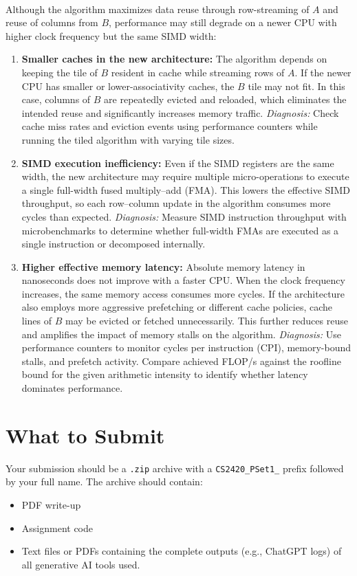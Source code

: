 \documentclass[a4 paper]{article}
\begin{document}
\\

\noindent Although the algorithm maximizes data reuse through row-streaming of $A$ and reuse of columns from $B$, performance may still degrade on a newer CPU with higher clock frequency but the same SIMD width:

\begin{enumerate}
    \item \textbf{Smaller caches in the new architecture:}  
    The algorithm depends on keeping the tile of $B$ resident in cache while streaming rows of $A$. If the newer CPU has smaller or lower-associativity caches, the $B$ tile may not fit. In this case, columns of $B$ are repeatedly evicted and reloaded, which eliminates the intended reuse and significantly increases memory traffic.  
    \textit{Diagnosis:} Check cache miss rates and eviction events using performance counters while running the tiled algorithm with varying tile sizes.

    \item \textbf{SIMD execution inefficiency:}  
    Even if the SIMD registers are the same width, the new architecture may require multiple micro-operations to execute a single full-width fused multiply–add (FMA). This lowers the effective SIMD throughput, so each row–column update in the algorithm consumes more cycles than expected.  
    \textit{Diagnosis:} Measure SIMD instruction throughput with microbenchmarks to determine whether full-width FMAs are executed as a single instruction or decomposed internally.

    \item \textbf{Higher effective memory latency:}  
    Absolute memory latency in nanoseconds does not improve with a faster CPU. When the clock frequency increases, the same memory access consumes more cycles. If the architecture also employs more aggressive prefetching or different cache policies, cache lines of $B$ may be evicted or fetched unnecessarily. This further reduces reuse and amplifies the impact of memory stalls on the algorithm.  
    \textit{Diagnosis:} Use performance counters to monitor cycles per instruction (CPI), memory-bound stalls, and prefetch activity. Compare achieved FLOP/s against the roofline bound for the given arithmetic intensity to identify whether latency dominates performance.
\end{enumerate}


\newpage
\section{What to Submit}
\label{sec:submission}
Your submission should be a \texttt{.zip} archive with a \texttt{CS2420\_PSet1\_} prefix followed by your full name.
The archive should contain:
\begin{itemize}
    \item PDF write-up
    \item Assignment code
    \item Text files or PDFs containing the complete outputs (e.g., ChatGPT logs) of all generative AI tools used.
\end{itemize}
\end{document}
